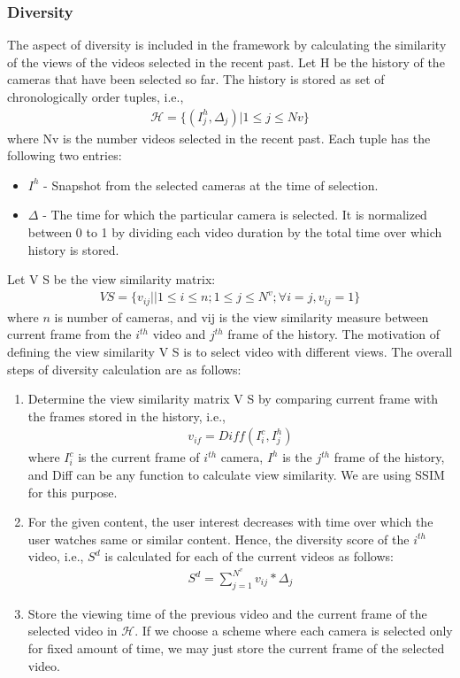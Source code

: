 \documentclass{sig-alternate}
\begin{document}
  \subsubsection{Diversity}
  The aspect of diversity is included in the framework by calculating the similarity of the views of the videos selected in the recent past. Let H be the history of the cameras that have been selected so far. The history is stored as set of chronologically order tuples, i.e.,
  \begin{align}
      \mathcal{H}=\{(I^h_j , \Delta_j )|1 \leq j \leq Nv\}
  \end{align}
  where Nv is the number videos selected in the recent past. Each tuple has the following two entries:
  \begin{itemize}
      \item $I^h$ - Snapshot from the selected cameras at the time of selection.
      \item $\Delta$ - The time for which the particular camera is selected. It
is normalized between 0 to 1 by dividing each video duration
by the total time over which history is stored.
  \end{itemize}
  Let V S be the view similarity matrix:
  \begin{align}
    VS= \{v_{ij}||1 \leq i \leq n; 1 \leq j \leq N^v; \forall i = j, v_{ij} = 1\}    
  \end{align}
  where $n$ is number of cameras, and vij is the view similarity measure between current frame from the $i^{th}$ video and $j^{th}$ frame of the history. The motivation of defining the view similarity V S is to select video with different views. The overall steps of diversity calculation are as follows:
  \begin{enumerate}
      \item Determine the view similarity matrix V S by comparing current frame with the frames stored in the history, i.e.,
      \begin{align}
          v_{if}= Diff(I^c_i,I^h_j)
      \end{align}
      where $I^c_i$ is the current frame of $i^{th}$ camera, $I^h$ is the $j^{th}$ frame of the history, and Diff can be any function to calculate view similarity. We are using SSIM \cite{17} for this purpose.
      \item For the given content, the user interest decreases with time over which the user watches same or similar content. Hence, the diversity score of the $i^{th}$ video, i.e., $S^d$ is calculated for each of the current videos as follows:
      \begin{align}
          S^d = \sum_{j=1}^{N^v}v_{ij} * \Delta_j
      \end{align}
      \item Store the viewing time of the previous video and the current frame of the selected video in $\mathcal{H}$. If we choose a scheme where each camera is selected only for fixed amount of time, we may just store the current frame of the selected video.
    \end{enumerate}
\end{document}
